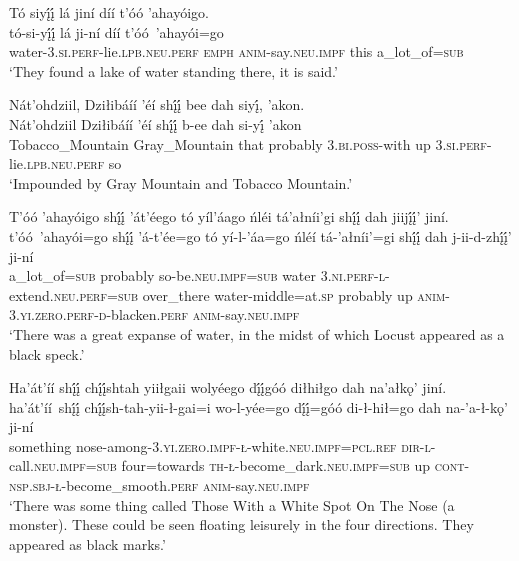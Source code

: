 \ea\label{ex:text4-4-2}
Tó siyį́į́ lá jiní díí t’óó ’ahayóigo.\\
\gll tó-si-yį́į́	lá	ji-ní	díí	t’óó~{’ahayói=go}\\
     water-3.\textsc{si}.\textsc{perf}-lie.\textsc{lpb}.\textsc{neu}.\textsc{perf}	\textsc{emph}	\textsc{anim}-say.\textsc{neu}.\textsc{impf}	this	a\_lot\_of=\textsc{sub}\\
\glt `They found a lake of water standing there, it is said.'
\z

\ea\label{ex:text4-4-3}
Nát’ohdziil, Dziłibáíí ’éí shį́į́ bee dah siyį́, ’akon.\\
\gll Nát’ohdziil	Dziłibáíí	’éí	shį́į́	b-ee	dah	si-yį́	’akon\\
     Tobacco\_Mountain	Gray\_Mountain	that	probably	3.\textsc{bi}.\textsc{poss}-with	up	3.\textsc{si}.\textsc{perf}-lie.\textsc{lpb}.\textsc{neu}.\textsc{perf}	so\\
\glt `Impounded by Gray Mountain and Tobacco Mountain.'
\z

\ea\label{ex:text4-4-4}
T’óó ’ahayóigo shį́į́ ’át’éego tó yíl’áago ńléi tá’ałníi’gi shį́į́ dah jiijį́į́’ jiní.\\
\gll t’óó~{’ahayói=go}	shį́į́	’á-t’ée=go	tó	yí-l-’áa=go	ńléí	tá-’ałníi’=gi	shį́į́	dah	j-ii-d-zhį́į́’	ji-ní\\
     a\_lot\_of=\textsc{sub}	probably	so-be.\textsc{neu}.\textsc{impf}=\textsc{sub}	water	3.\textsc{ni}.\textsc{perf}-\textsc{l}-extend.\textsc{neu}.\textsc{perf}=\textsc{sub}	over\_there	water-middle=at.\textsc{sp}	probably	up	\textsc{anim}-3.\textsc{yi}.\textsc{zero}.\textsc{perf}-\textsc{d}-blacken.\textsc{perf}	\textsc{anim}-say.\textsc{neu}.\textsc{impf}\\
\glt `There was a great expanse of water, in the midst of which Locust appeared as a black speck.'
\z

\ea\label{ex:text4-4-5}
Ha’át’íí shį́į́ chį́į́shtah yiiłgaii wolyéego dį́į́góó diłhiłgo dah na’ałkǫ’ jiní.\\
\gll ha’át’íí~{shį́į́}	chį́į́sh-tah-yii-ł-gai=i	wo-l-yée=go	dį́į́=góó	di-ł-hił=go	dah	na-’a-ł-kǫ’	ji-ní\\
     something	nose-among-3.\textsc{yi}.\textsc{zero}.\textsc{impf}-\textsc{ł}-white.\textsc{neu}.\textsc{impf}=\textsc{pcl}.\textsc{ref}	\textsc{dir}-\textsc{l}-call.\textsc{neu}.\textsc{impf}=\textsc{sub}	four=towards	\textsc{th}-\textsc{ł}-become\_dark.\textsc{neu}.\textsc{impf}=\textsc{sub}	up	\textsc{cont}-\textsc{nsp}.\textsc{sbj}-\textsc{ł}-become\_smooth.\textsc{perf}	\textsc{anim}-say.\textsc{neu}.\textsc{impf}\\
\glt `There was some thing called Those With a White Spot On The Nose (a monster). These could be seen floating leisurely in the four directions. They appeared as black marks.'
\z

